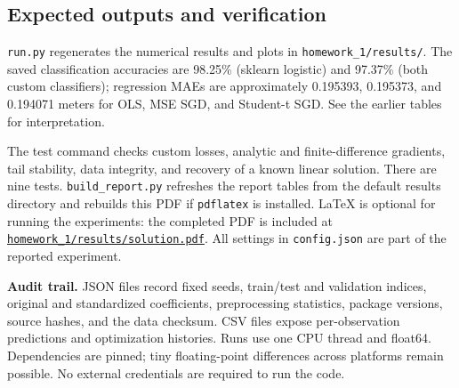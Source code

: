 \documentclass[10pt,letterpaper]{article}
\newcommand{\code}[1]{\texttt{#1}}
\begin{document}
\subsection*{Expected outputs and verification}
\code{run.py} regenerates the numerical results and plots in
\code{homework\_1/results/}. The saved classification accuracies are 98.25\%
(sklearn logistic) and 97.37\% (both custom classifiers); regression MAEs are
approximately 0.195393, 0.195373, and 0.194071 meters for OLS, MSE SGD, and
Student-t SGD. See the earlier tables for interpretation.

The test command checks custom losses, analytic and finite-difference gradients,
tail stability, data integrity, and recovery of a known linear solution.
There are nine tests. \code{build\_report.py} refreshes the report tables from
the default results directory and rebuilds this PDF if \code{pdflatex} is installed.
LaTeX is optional for running the experiments: the completed PDF is included at
\href{https://github.com/richard0525/foundations-machine-learning-ai/blob/main/homework_1/results/solution.pdf}{\code{homework\_1/results/solution.pdf}}.
All settings in \code{config.json} are part of the reported experiment.

\textbf{Audit trail.} JSON files record fixed seeds, train/test and validation
indices, original and standardized coefficients, preprocessing statistics,
package versions, source hashes, and the data checksum. CSV files expose
per-observation predictions and optimization histories. Runs use one CPU thread
and float64. Dependencies are pinned; tiny floating-point differences across
platforms remain possible. No external credentials are required to run the code.

\newpage
\end{document}
